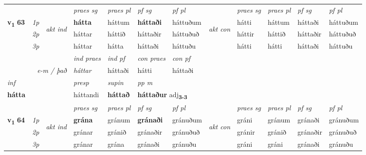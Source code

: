\begin{longtable}[l]{X>{\footnotesize\itshape}llXXXXlXXXX}
 & &   & \textit{praes sg}  & \textit{praes pl}    & \textit{ pf sg} & \textit{pf pl} & & \textit{praes sg}  & \textit{praes pl}    & \textit{pf sg} & \textit{pf pl }  \\ \cmidrule{4-7} \cmidrule{9-12}
 \multirow{2}{*}{{{\textbf{v{\textsubscript{1}}} \Large{\textbf{63}}}}}  & 1p & \multirow{3}{*}{\begin{turn}{90}\textit{akt ind}\end{turn}} & \textbf{hátta} & háttum & \textbf{háttaði} & háttuðum & \multirow{3}{*}{\begin{turn}{90}\textit{akt con}\end{turn}} &hátti & háttum & háttaði & háttuðum\\*
 & 2p &  &  háttar  & háttið & háttaðir & háttuðuð & & háttir & háttið & háttaðir & háttuðuð \\*
 & 3p &  & háttar & hátta & háttaði & háttuðu & & hátti & hátti& háttaði & háttuðu \\*
\cmidrule{4-7} \cmidrule{9-12}

   && &  \textit{ind praes} & \textit{ind pf} & \textit{con praes} & \textit{con pf} \\*
\multicolumn{3}{r}{\textit{e-m / það}} & háttar & háttaði & hátti & háttaði \\*

\cmidrule{4-7}
   {\textit{inf}} & &     & \textit{presp} & \textit{supin}  & \textit{pp m} \\*
  {\textbf{hátta}} & &     & háttandi &  \textbf{háttað}  & \multicolumn{2}{l}{\textbf{háttaður} adj\textbf{\textsubscript{3-3}}} \\*

\midrule

 & &   & \textit{praes sg}  & \textit{praes pl}    & \textit{ pf sg} & \textit{pf pl} & & \textit{praes sg}  & \textit{praes pl}    & \textit{pf sg} & \textit{pf pl }  \\ \cmidrule{4-7} \cmidrule{9-12}
 \multirow{2}{*}{{{\textbf{v{\textsubscript{1}}} \Large{\textbf{64}}}}}  & 1p & \multirow{3}{*}{\begin{turn}{90}\textit{akt ind}\end{turn}} & \textbf{grána} & gránum & \textbf{gránaði} & gránuðum & \multirow{3}{*}{\begin{turn}{90}\textit{akt con}\end{turn}} &gráni & gránum & gránaði & gránuðum\\*
 & 2p &  &  gránar  & gránið & gránaðir & gránuðuð & & gránir & gránið & gránaðir & gránuðuð \\*
 & 3p &  & gránar & grána & gránaði & gránuðu & & gráni & gráni& gránaði & gránuðu \\*
\cmidrule{4-7} \cmidrule{9-12}


\end{longtable}
